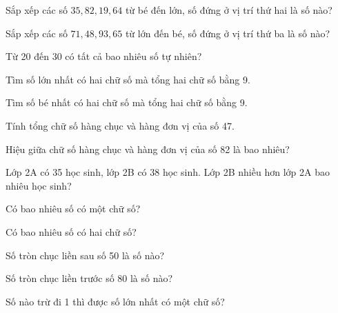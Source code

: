 \begin{ex}
Sắp xếp các số $35, 82, 19, 64$ từ bé đến lớn, số đứng ở vị trí thứ hai là số nào?
\end{ex}

\begin{ex}
Sắp xếp các số $71, 48, 93, 65$ từ lớn đến bé, số đứng ở vị trí thứ ba là số nào?
\end{ex}

\begin{ex}
Từ 20 đến 30 có tất cả bao nhiêu số tự nhiên?
\end{ex}

\begin{ex}
Tìm số lớn nhất có hai chữ số mà tổng hai chữ số bằng 9.
\end{ex}

\begin{ex}
Tìm số bé nhất có hai chữ số mà tổng hai chữ số bằng 9.
\end{ex}

\begin{ex}
Tính tổng chữ số hàng chục và hàng đơn vị của số 47.
\end{ex}

\begin{ex}
Hiệu giữa chữ số hàng chục và hàng đơn vị của số 82 là bao nhiêu?
\end{ex}

\begin{ex}
Lớp 2A có 35 học sinh, lớp 2B có 38 học sinh. Lớp 2B nhiều hơn lớp 2A bao nhiêu học sinh?
\end{ex}

\begin{ex}
Có bao nhiêu số có một chữ số?
\end{ex}

\begin{ex}
Có bao nhiêu số có hai chữ số?
\end{ex}

\begin{ex}
Số tròn chục liền sau số 50 là số nào?
\end{ex}

\begin{ex}
Số tròn chục liền trước số 80 là số nào?
\end{ex}

\begin{ex}
Số nào trừ đi 1 thì được số lớn nhất có một chữ số?
\end{ex}
